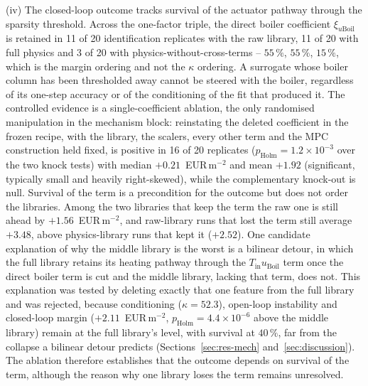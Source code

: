 (iv) The closed-loop outcome tracks survival of the actuator pathway through the
sparsity threshold. Across the one-factor triple, the direct boiler
coefficient $\xi_{u\mathrm{Boil}}$ is retained in 11 of 20 identification replicates with
the raw library, 11 of 20 with full physics and 3 of 20 with physics-without-cross-terms
-- $55\,\%$, $55\,\%$, $15\,\%$, which is the margin ordering and not the $\kappa$
ordering. A surrogate whose boiler column has been thresholded away cannot be steered
with the boiler, regardless of its one-step accuracy or of the conditioning of the fit
that produced it. The controlled evidence is a single-coefficient ablation, the only
randomised manipulation in the mechanism block: reinstating the deleted coefficient in
the frozen recipe, with the library, the scalers, every other term and the MPC
construction held fixed, is positive in 16 of 20 replicates
($p_{\mathrm{Holm}} = 1.2 \times 10^{-3}$ over the two knock tests) with median
$+0.21$~EUR\,m$^{-2}$ and mean
$+1.92$ (significant, typically small and heavily right-skewed), while the
complementary knock-out is null. Survival of the term is a precondition for the outcome
but does not order the libraries.
Among the two libraries that keep the term the raw one is still ahead by
$+1.56$~EUR\,m$^{-2}$, and raw-library runs that lost the term still average $+3.48$,
above physics-library runs that kept it ($+2.52$). One candidate explanation of why the
middle library is the worst is a bilinear detour, in which the full library retains its
heating pathway through the $T_{\mathrm{in}}u_{\mathrm{Boil}}$ term once the direct
boiler term is cut and the middle library, lacking that term, does not. This explanation
was tested by deleting exactly that one feature from the full library and was rejected,
because conditioning ($\kappa = 52.3$), open-loop instability and closed-loop margin
($+2.11$~EUR\,m$^{-2}$, $p_{\mathrm{Holm}} = 4.4 \times 10^{-6}$ above the middle library)
remain at the full library's level, with survival at $40\,\%$, far from the collapse a
bilinear detour predicts (Sections~\ref{sec:res-mech} and~\ref{sec:discussion}). The ablation therefore establishes that the outcome depends
on survival of the term, although the reason why one library loses the term remains
unresolved.

